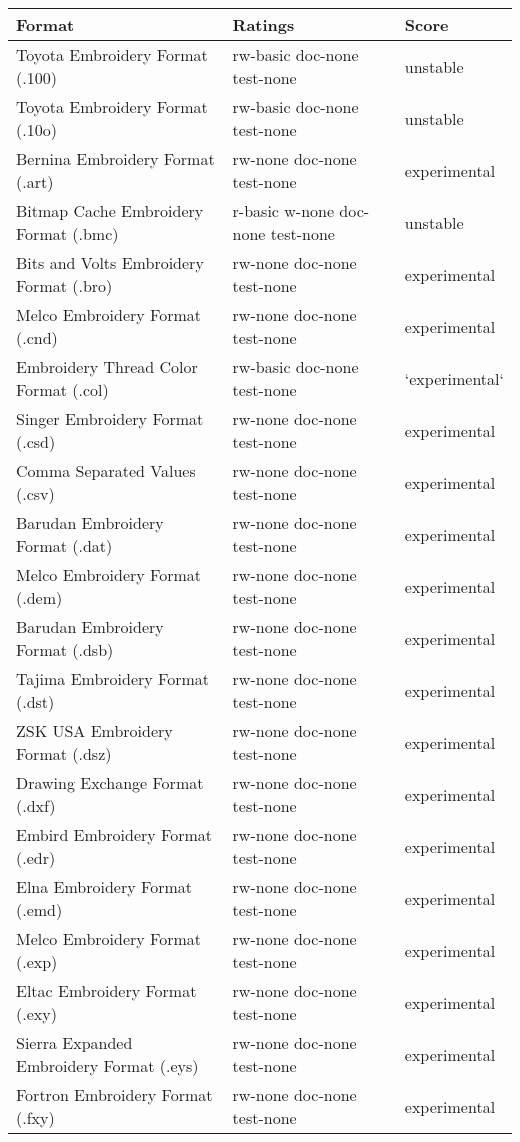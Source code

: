 \begin{longtable}{l l l}
Format & Ratings & Score \\
\hline
Toyota Embroidery Format (.100) & rw-basic doc-none test-none & unstable \\
Toyota Embroidery Format (.10o) & rw-basic doc-none test-none & unstable \\
Bernina Embroidery Format (.art) & rw-none doc-none test-none & experimental \\
Bitmap Cache Embroidery Format (.bmc) & r-basic w-none doc-none test-none & unstable \\
Bits and Volts Embroidery Format (.bro) & rw-none doc-none test-none & experimental \\
Melco Embroidery Format (.cnd) & rw-none doc-none test-none & experimental \\
Embroidery Thread Color Format (.col) & rw-basic doc-none test-none & `experimental` \\
Singer Embroidery Format (.csd) & rw-none doc-none test-none & experimental \\
Comma Separated Values (.csv) & rw-none doc-none test-none & experimental \\
Barudan Embroidery Format (.dat) & rw-none doc-none test-none & experimental \\ Melco Embroidery Format (.dem) & rw-none doc-none test-none & experimental \\
Barudan Embroidery Format (.dsb) & rw-none doc-none test-none & experimental \\
Tajima Embroidery Format (.dst) & rw-none doc-none test-none & experimental \\
ZSK USA Embroidery Format (.dsz) & rw-none doc-none test-none & experimental \\
Drawing Exchange Format (.dxf) & rw-none doc-none test-none & experimental \\
Embird Embroidery Format (.edr) & rw-none doc-none test-none & experimental \\
Elna Embroidery Format (.emd) & rw-none doc-none test-none & experimental \\
Melco Embroidery Format (.exp) & rw-none doc-none test-none & experimental \\
Eltac Embroidery Format (.exy) & rw-none doc-none test-none & experimental \\
Sierra Expanded Embroidery Format (.eys) & rw-none doc-none test-none & experimental \\
Fortron Embroidery Format (.fxy) & rw-none doc-none test-none & experimental \\

\end{longtable}
